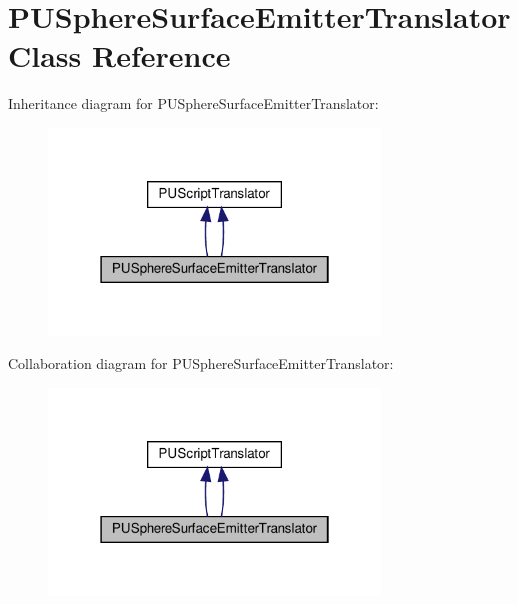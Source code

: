 \hypertarget{classPUSphereSurfaceEmitterTranslator}{}\section{P\+U\+Sphere\+Surface\+Emitter\+Translator Class Reference}
\label{classPUSphereSurfaceEmitterTranslator}


Inheritance diagram for P\+U\+Sphere\+Surface\+Emitter\+Translator\+:
\nopagebreak
\begin{figure}[H]
\begin{center}
\leavevmode
\includegraphics[width=250pt]{classPUSphereSurfaceEmitterTranslator__inherit__graph}
\end{center}
\end{figure}


Collaboration diagram for P\+U\+Sphere\+Surface\+Emitter\+Translator\+:
\nopagebreak
\begin{figure}[H]
\begin{center}
\leavevmode
\includegraphics[width=250pt]{classPUSphereSurfaceEmitterTranslator__coll__graph}
\end{center}
\end{figure}
